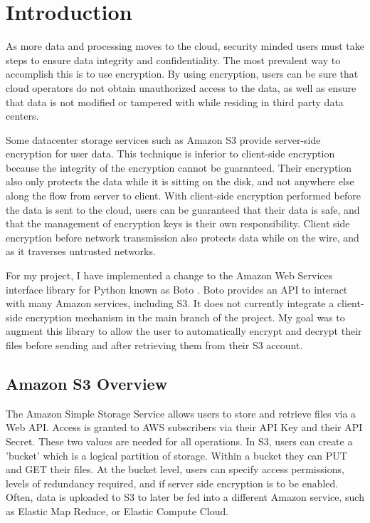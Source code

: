 \section{Introduction}
As more data and processing moves to the cloud, security minded users must take steps to ensure data integrity and confidentiality.
The most prevalent way to accomplish this is to use encryption. 
By using encryption, users can be sure that cloud operators do not
obtain unauthorized access to the data, as well as ensure that data is not modified or tampered with while residing in third party data centers.

Some datacenter storage services such as Amazon S3 \cite{amazons3} provide server-side encryption for user data. This technique is inferior to client-side encryption because the integrity of the encryption cannot be guaranteed.
Their encryption also only protects the data while it is sitting on the disk, and not anywhere else along the flow from server to client.
With client-side encryption performed before the data is sent to the cloud, users can be guaranteed that their data is safe, and that the management of encryption keys is their own responsibility. 
Client side encryption before network transmission also protects data while on the wire, and as it traverses untrusted networks.

For my project, I have implemented a change to the Amazon Web Services interface library for Python known as Boto \cite{boto}. Boto provides an API to interact with many Amazon services, including S3. 
It does not currently integrate a client-side encryption mechanism in the main branch of the project. 
My goal was to augment this library to allow the user to automatically encrypt and decrypt their files before sending and after retrieving them from their S3 account.

\subsection{Amazon S3 Overview}
The Amazon Simple Storage Service allows users to store and retrieve files via a Web API. Access is granted to AWS subscribers via their API Key and their API Secret. These two values are needed for all operations. In S3, users can create a 'bucket' which is a logical partition of storage. Within a bucket they can PUT and GET their files. At the bucket level, users can specify access permissions, levels of redundancy required, and if server side encryption is to be enabled. Often, data is uploaded to S3 to later be fed into a different Amazon service, such as Elastic Map Reduce, or Elastic Compute Cloud.

